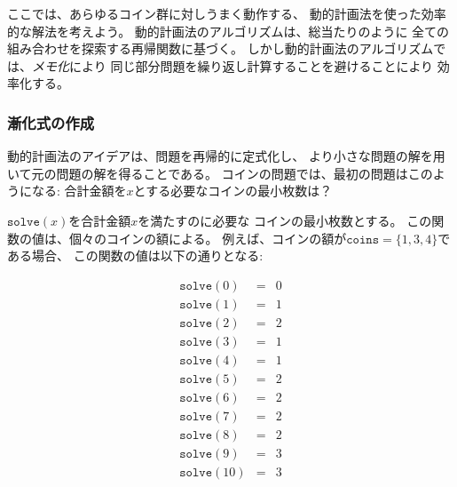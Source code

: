 ここでは、あらゆるコイン群に対しうまく動作する、
動的計画法を使った効率的な解法を考えよう。
動的計画法のアルゴリズムは、総当たりのように
全ての組み合わせを探索する再帰関数に基づく。
しかし動的計画法のアルゴリズムでは、\emph{メモ化}により
同じ部分問題を繰り返し計算することを避けることにより
効率化する。

\begin{comment}
\subsubsection{Recursive formulation}

The idea in dynamic programming is to
formulate the problem recursively so
that the solution to the problem can be
calculated from solutions to smaller
subproblems.
In the coin problem, a natural recursive
problem is as follows:
what is the smallest number of coins
required to form a sum $x$?
\end{comment}

\subsubsection{漸化式の作成}

動的計画法のアイデアは、問題を再帰的に定式化し、
より小さな問題の解を用いて元の問題の解を得ることである。
コインの問題では、最初の問題はこのようになる:
合計金額を$x$とする必要なコインの最小枚数は？

\begin{comment}
Let $\texttt{solve}(x)$
denote the minimum
number of coins required for a sum $x$.
The values of the function depend on the
values of the coins.
For example, if $\texttt{coins} = \{1,3,4\}$,
the first values of the function are as follows:
\end{comment}

$\texttt{solve}(x)$を合計金額$x$を満たすのに必要な
コインの最小枚数とする。
この関数の値は、個々のコインの額による。
例えば、コインの額が$\texttt{coins} = \{1,3,4\}$である場合、
この関数の値は以下の通りとなる:

\[
\begin{array}{lcl}
\texttt{solve}(0) & = & 0 \\
\texttt{solve}(1) & = & 1 \\
\texttt{solve}(2) & = & 2 \\
\texttt{solve}(3) & = & 1 \\
\texttt{solve}(4) & = & 1 \\
\texttt{solve}(5) & = & 2 \\
\texttt{solve}(6) & = & 2 \\
\texttt{solve}(7) & = & 2 \\
\texttt{solve}(8) & = & 2 \\
\texttt{solve}(9) & = & 3 \\
\texttt{solve}(10) & = & 3 \\
\end{array}
\]


